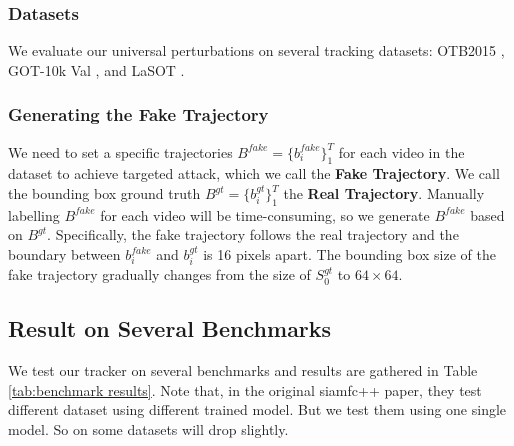 \documentclass{article}
\begin{document}
\subsubsection{Datasets}
We evaluate our universal perturbations on several tracking datasets: OTB2015 \cite{OTB}, GOT-10k Val \cite{GOT-10k}, and LaSOT \cite{LaSOT}.


\subsubsection{Generating the Fake Trajectory}

We need to set a specific trajectories $B^{fake}=\{b^{fake}_i\}_1^{T}$ for each video in the dataset to achieve targeted attack, which we call the \textbf{Fake Trajectory}. We call the bounding box ground truth $B^{gt}=\{b^{gt}_i\}_1^T$ the \textbf{Real Trajectory}.
Manually labelling $B^{fake}$ for each video will be time-consuming, so we generate $B^{fake}$ based on $B^{gt}$.
Specifically, the fake trajectory follows the real trajectory and the boundary between $b^{fake}_i$ and $b^{gt}_i$ is 16 pixels apart.
The bounding box size of the fake trajectory gradually changes from the size of $S^{gt}_0$ to $64\times 64$.

\subsection{Result on Several Benchmarks}

We test our tracker on several benchmarks and results are gathered in Table \ref{tab:benchmark results}.
Note that, in the original siamfc++ paper, they test different dataset using different trained model. But we test them using one single model. So on some datasets will drop slightly.
\end{document}
